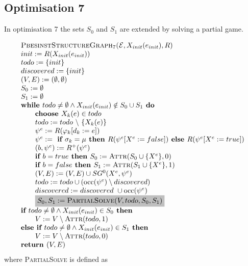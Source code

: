 \documentclass{article}
\begin{document}
\subsection{Optimisation 7}
In optimisation 7 the sets $S_0$ and $S_1$ are extended by solving a partial game.

\begin{equation*}
\begin{array}{l}
\textsc{PbesinstStructureGraph$_{7}$(}\mathcal{E}, X_{init}(e_{init}), R) \\ 
init:=R(X_{init}(e_{init})) \\
todo:=\{init\} \\
discovered:=\{init\} \\
(V,E) :=(\emptyset ,\emptyset ) \\ 
S_0:= \emptyset \\
S_1:= \emptyset \\
\textbf{while }todo \neq \emptyset \wedge X_{init}(e_{init}) \notin S_0 \cup S_1 \textbf{ do} \\ 
\qquad \text{\textbf{choose }}X_{k}(e)\in todo \\ 
\qquad todo:=todo\ \backslash \ \{X_{k}(e)\} \\ 
\qquad \psi ^{e}:=R(\varphi _{k}[d_{k}:=e]) \\ 
\qquad \psi^e := \textbf{ if } \sigma_k = \mu \textbf{ then } R(\psi^e[X^e := false])
\textbf{ else }  R(\psi^e[X^e := true]) \\
\qquad (b,\psi^e) := R^+(\psi^e) \\
\qquad \textbf{if $b = true$ then } S_0 := \textsc{Attr}(S_0 \cup \{ X^e \}, 0) \\
\qquad \textbf{if $b = false$ then } S_1 := \textsc{Attr}(S_1 \cup \{ X^e \}, 1) \\
\qquad (V,E) := (V,E) \cup SG^{0}(X^{e},\psi ^{e}) \\ 
\qquad todo:=todo\cup (\mathrm{occ}(\psi ^{e})\setminus discovered) \\
\qquad discovered:=discovered\ \cup \mathrm{occ}(\psi ^{e}) \\
\qquad \colorbox{lightgray}{$
S_0, S_1 := \textsc{PartialSolve}(V,todo,S_0,S_1) $}\\
\textbf{if } todo \neq \emptyset \land X_{init}(e_{init}) \in S_0 \textbf{ then }\\
\qquad V := V \setminus \textsc{Attr}(todo, 1) \\
\textbf{else if } todo \neq \emptyset \land X_{init}(e_{init}) \in S_1 \textbf{ then }\\
\qquad V := V \setminus \textsc{Attr}(todo, 0) \\
\text{\textbf{return }}(V, E)
\end{array}
\end{equation*}
where \textsc{PartialSolve} is defined as
\end{document}
